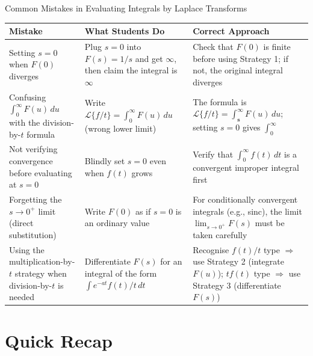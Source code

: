 \documentclass[12pt,a4paper]{article}
\begin{document}
\begin{mistakebox}{Common Mistakes in Evaluating Integrals by Laplace Transforms}

\begin{tabular}{@{}p{3.5cm} p{5cm} p{5cm}@{}}
\toprule
\textbf{Mistake} & \textbf{What Students Do} & \textbf{Correct Approach} \\
\midrule
Setting $s = 0$ when $F(0)$ diverges
  & Plug $s = 0$ into $F(s) = 1/s$ and get $\infty$, then claim the integral is $\infty$
  & Check that $F(0)$ is finite before using Strategy 1; if not, the original integral diverges \\
\midrule
Confusing $\int_0^\infty F(u)\,du$ with the division-by-$t$ formula
  & Write $\mathcal{L}\{f/t\} = \int_0^\infty F(u)\,du$ (wrong lower limit)
  & The formula is $\mathcal{L}\{f/t\} = \int_{\mathbf{s}}^\infty F(u)\,du$; setting $s = 0$ gives $\int_0^\infty$ \\
\midrule
Not verifying convergence before evaluating at $s = 0$
  & Blindly set $s = 0$ even when $f(t)$ grows
  & Verify that $\int_0^\infty f(t)\,dt$ is a convergent improper integral first \\
\midrule
Forgetting the $s \to 0^+$ limit (direct substitution)
  & Write $F(0)$ as if $s = 0$ is an ordinary value
  & For conditionally convergent integrals (e.g., sinc), the limit $\lim_{s\to 0^+} F(s)$ must be taken carefully \\
\midrule
Using the multiplication-by-$t$ strategy when division-by-$t$ is needed
  & Differentiate $F(s)$ for an integral of the form $\int e^{-at}f(t)/t\,dt$
  & Recognise $f(t)/t$ type $\Rightarrow$ use Strategy 2 (integrate $F(u)$); $tf(t)$ type $\Rightarrow$ use Strategy 3 (differentiate $F(s)$) \\
\bottomrule
\end{tabular}

\end{mistakebox}

\section{Quick Recap}
\end{document}
